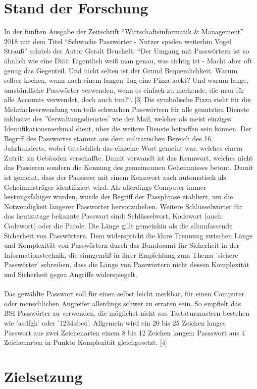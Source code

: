\section{Stand der Forschung}
In der fünften Ausgabe der Zeitschrift ``Wirtschaftsinformatik \& Management''  2018 mit dem Titel ``Schwache Passwörter - Nutzer spielen weiterhin Vogel Strauß'' schrieb der Autor Geralt Beuchelt: ``Der Umgang mit Passwörtern ist so ähnlich wie eine Diät: Eigentlich weiß man genau, was richtig ist - Macht aber oft genug das Gegenteil. Und nicht selten ist der Grund Bequemlichkeit. Warum selber kochen, wann nach einem langen Tag eine Pizza lockt? Und warum lange, umständliche Passwörter verwenden, wenn es einfach zu merkende, die man für alle Accounts verwendet, doch auch tun?``. [3]
Die symbolische Pizza steht für die Mehrfachverwendung von teils schwachen Passwörtern für alle genutzten Dienste inklusive des 'Verwaltungsdienstes' wie der Mail, welches als meist einziges Identifikationsmerkmal dient, über die weitere Dienste betroffen sein können. Der Begriff des Passwortes stammt aus dem militärischen Bereich des 16. Jahrhunderts, wobei tatsächlich das einzelne Wort gemeint war, welches einem Zutritt zu Gebäuden verschaffte. Damit verwandt ist das Kennwort, welches nicht das Passieren sondern die Kennung des gemeinsamen Geheimnisses betont. Damit ist gemeint, dass der Passierer mit einem Kennwort auch automatisch als Geheimnisträger identifiziert wird. Als allerdings Computer immer leistungsfähiger wurden, wurde der Begriff der Passphrase etabliert, um die Notwendigkeit längerer Passwörter hervorzuheben. Weitere Schlüsselwörter für das heutzutage bekannte Passwort sind: Schlüsselwort, Kodewort (auch: Codewort) oder die Parole. Die Länge gillt gemeinhin als die allumfassende Sicherheit von Passwörtern. Dem widerspricht die klare Trennung zwischen Länge und Komplexität von Passwörtern durch das Bundesamt für Sicherheit in der Informationstechnik, die sinngemäß in ihrer Empfehlung zum Thema 'sichere Passwörter' schreiben, dass die Länge von Passwörtern nicht dessen Komplexität und Sicherheit gegen Angriffe widerspiegelt.\\
\\
Das gewählte Passwort soll für einen selbst leicht merkbar, für einen Computer oder menschlichen Angreifer allerdings schwer zu erraten sein. So empfielt das BSI Passwörter zu verwenden, die möglichst nicht aus Tastaturmustern bestehen wie 'asdfgh' oder '1234abcd'. Allgemein wird ein 20 bis 25 Zeichen langes Passwort aus zwei Zeichenarten einem 8 bis 12 Zeichen langem Passswort aus 4 Zeichenarten in Punkto Komplexität gleichgesetzt. [4]

\section{Zielsetzung}
\blindtext
